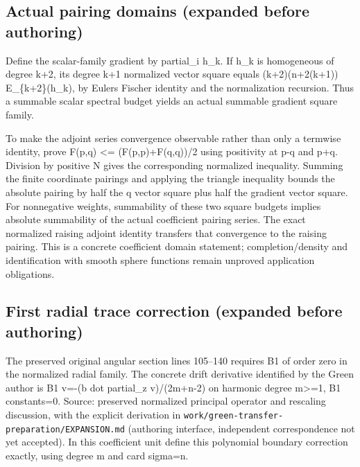 \documentclass[11pt]{article}
\theoremstyle{definition}
\theoremstyle{remark}
\numberwithin{equation}{section}
\begin{document}
\hypertarget{source-e4785d68ade7-actual-pairing-domains-expanded-before-authoring}{%
\subsection{Actual pairing domains (expanded before
authoring)}\label{source-e4785d68ade7-actual-pairing-domains-expanded-before-authoring}}

Define the scalar-family gradient by partial\_i h\_k. If h\_k is
homogeneous of degree k+2, its degree k+1 normalized vector square
equals (k+2)(n+2(k+1)) E\_\{k+2\}(h\_k), by Euler\textquotesingle s
Fischer identity and the normalization recursion. Thus a summable scalar
spectral budget yields an actual summable gradient square family.

To make the adjoint series convergence observable rather than only a
termwise identity, prove \textbar F(p,q)\textbar{} \textless=
(F(p,p)+F(q,q))/2 using positivity at p-q and p+q. Division by positive
N gives the corresponding normalized inequality. Summing the finite
coordinate pairings and applying the triangle inequality bounds the
absolute pairing by half the q vector square plus half the gradient
vector square. For nonnegative weights, summability of these two square
budgets implies absolute summability of the actual coefficient pairing
series. The exact normalized raising adjoint identity transfers that
convergence to the raising pairing. This is a concrete coefficient
domain statement; completion/density and identification with smooth
sphere functions remain unproved application obligations.

\hypertarget{source-e4785d68ade7-first-radial-trace-correction-expanded-before-authoring}{%
\subsection{First radial trace correction (expanded before
authoring)}\label{source-e4785d68ade7-first-radial-trace-correction-expanded-before-authoring}}

The preserved original angular section lines 105--140 requires B1 of
order zero in the normalized radial family. The concrete drift
derivative identified by the Green author is B1 v=-(b dot partial\_z
v)/(2m+n-2) on harmonic degree m\textgreater=1, B1 constants=0. Source:
preserved normalized principal operator and rescaling discussion, with
the explicit derivation in
\nolinkurl{work/green-transfer-preparation/EXPANSION.md} (authoring
interface, independent correspondence not yet accepted). In this
coefficient unit define this polynomial boundary correction exactly,
using degree m and card sigma=n.
\end{document}
